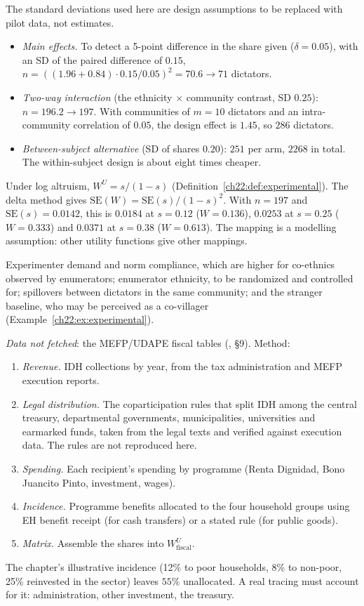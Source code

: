\documentclass[../solutions_manual.tex]{subfiles}
\begin{document}
 The standard deviations used here are design assumptions to be replaced with pilot data, not estimates.
\begin{itemize}
\item \emph{Main effects.} To detect a 5-point difference in the share given ($\delta = 0.05$), with an SD of the paired difference of $0.15$, $n = ((1.96 + 0.84)\cdot0.15/0.05)^2 = 70.6 \to 71$ dictators.
\item \emph{Two-way interaction} (the ethnicity $\times$ community contrast, SD $0.25$): $n = 196.2 \to 197$. With communities of $m = 10$ dictators and an intra-community correlation of $0.05$, the design effect is $1.45$, so $286$ dictators.
\item \emph{Between-subject alternative} (SD of shares $0.20$): $251$ per arm, $2268$ in total. The within-subject design is about eight times cheaper.
\end{itemize}

 Under log altruism, $W^U = s/(1-s)$ (Definition~\ref{ch22:def:experimental}). The delta method gives $\mathrm{SE}(W) = \mathrm{SE}(s)/(1-s)^2$. With $n = 197$ and $\mathrm{SE}(s) = 0.0142$, this is $0.0184$ at $s = 0.12$ ($W = 0.136$), $0.0253$ at $s = 0.25$ ($W = 0.333$) and $0.0371$ at $s = 0.38$ ($W = 0.613$). The mapping is a modelling assumption: other utility functions give other mappings.

 Experimenter demand and norm compliance, which are higher for co-ethnics observed by enumerators; enumerator ethnicity, to be randomized and controlled for; spillovers between dictators in the same community; and the stranger baseline, who may be perceived as a co-villager (Example~\ref{ch22:ex:experimental}).


\emph{Data not fetched}: the MEFP/UDAPE fiscal tables (, \S9). Method:
\begin{enumerate}
\item \emph{Revenue.} IDH collections by year, from the tax administration and MEFP execution reports.
\item \emph{Legal distribution.} The coparticipation rules that split IDH among the central treasury, departmental governments, municipalities, universities and earmarked funds, taken from the legal texts and verified against execution data. The rules are not reproduced here.
\item \emph{Spending.} Each recipient's spending by programme (Renta Dignidad, Bono Juancito Pinto, investment, wages).
\item \emph{Incidence.} Programme benefits allocated to the four household groups using EH benefit receipt (for cash transfers) or a stated rule (for public goods).
\item \emph{Matrix.} Assemble the shares into $W^U_{\text{fiscal}}$.
\end{enumerate}
The chapter's illustrative incidence (12\% to poor households, 8\% to non-poor, 25\% reinvested in the sector) leaves $55\%$ unallocated. A real tracing must account for it: administration, other investment, the treasury.
\end{document}
